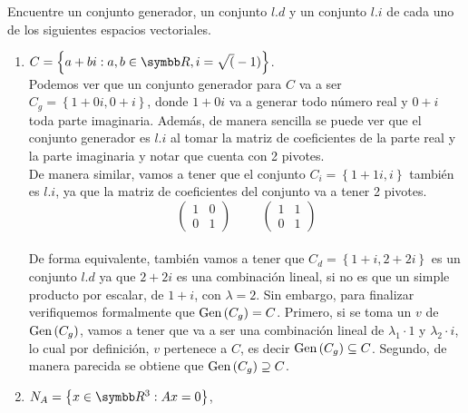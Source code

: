 \item Encuentre un conjunto generador, un conjunto \(l.d\) y un conjunto \(l.i\) de cada uno de los siguientes espacios vectoriales.
    \begin{enumerate}[label=\listAlph]
        \item \(C = \left\{a + bi: a,b \in \realR, i = \sqrt(-1)\right\}\). \\
            Podemos ver que un conjunto generador para \(C\) va a ser \(C_g = \left\{1 + 0i, 0 + i\right\}\), donde 
            \(1 + 0i\) va a generar todo número real y \(0 + i\) toda parte imaginaria. Además, de manera sencilla 
            se puede ver que el conjunto generador es \(l.i\) al tomar la matriz de coeficientes de la parte real y 
            la parte imaginaria y notar que cuenta con 2 pivotes.
            \\
            De manera similar, vamos a tener que el conjunto \(C_i = \left\{1 + 1i, i\right\}\) también es \(l.i\),
            ya que la matriz de coeficientes del conjunto va a tener 2 pivotes.
            \[
                \begin{pmatrix}
                    1 & 0 \\ 
                    0 & 1 
                \end{pmatrix}
                \hspace{1cm}
                \begin{pmatrix}
                    1 & 1 \\ 
                    0 & 1 
                \end{pmatrix}
            \]
            \\
            De forma equivalente, también vamos a tener que \(C_d = \left\{1 + i, 2 + 2i\right\}\) es un conjunto \(l.d\) 
            ya que \(2 + 2i\) es una combinación lineal, si no es que un simple producto por escalar, de \(1 + i\), con \(\lambda = 2\). 
            Sin embargo, para finalizar verifiquemos formalmente que \(\text{Gen} \left( C_g \right) = C\). Primero, si se toma un \(v\) de \(\text{Gen} \left( C_g \right)\),
            vamos a tener que va a ser una combinación lineal de \(\lambda_1 \cdot 1\) y \(\lambda_2 \cdot i\), lo cual por definición,
            \(v\) pertenece a \(C\), es decir \(\text{Gen} \left( C_g \right) \subseteq C\). Segundo, de manera parecida se obtiene que \(\text{Gen} \left( C_g \right) \supseteq C\).
        \setcounter{enumii}{2}
        \item \(N_A = \left\{x \in \realR^3: Ax = 0\right\}\), 

\end{enumerate}
